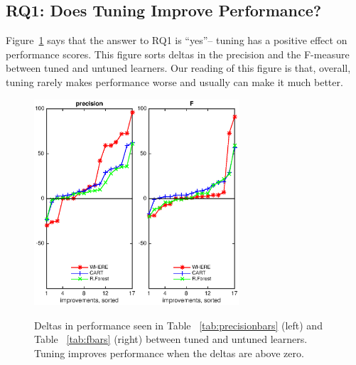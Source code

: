 \documentclass{sig-alternative}
\newcommand{\fig}[1]{Figure~\ref{fig:#1}}
\newcommand{\tab}[1]{Table ~\ref{tab:#1}}
\begin{document}
\subsection{RQ1:  Does  Tuning  Improve Performance? }\label{sect:precision}


\fig{deltas} says  that the answer to RQ1 is ``yes''-- tuning  has a positive effect on performance scores. This figure sorts
 deltas in the precision and the F-measure    between tuned and untuned learners. Our reading of this
figure is that, overall, tuning rarely makes performance   worse and usually can make it much better. 
 

\begin{figure}[!t]
\begin{center}
\includegraphics[width=1.5in]{./eps/precision_W.eps}\includegraphics[width=1.5in]{./eps/F_W.eps}
 \end{center}
\caption{Deltas in performance  seen in \tab{precisionbars} (left)
and \tab{fbars} (right) between tuned and untuned learners. Tuning improves performance when the deltas are above zero.}\label{fig:deltas}
 \end{figure}
 
\end{document}
